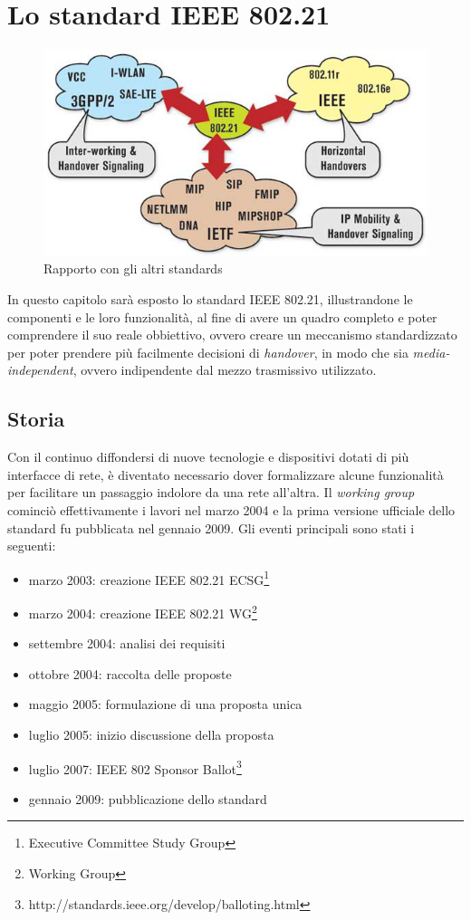 \chapter{Lo standard IEEE 802.21}

\begin{figure}[h!]
\centering
\includegraphics[scale=0.6]{ieee80221_cloud.jpg}
\caption{Rapporto con gli altri standards}
\end{figure}

In questo capitolo sarà esposto lo standard IEEE 802.21, illustrandone le componenti e le loro funzionalità, al fine di avere un quadro completo e poter comprendere il suo reale obbiettivo, ovvero creare un meccanismo standardizzato per poter prendere più facilmente decisioni di {\em handover}, in modo che sia {\em media-independent}, ovvero indipendente dal mezzo trasmissivo utilizzato.

\section{Storia}
Con il continuo diffondersi di nuove tecnologie e dispositivi dotati di più interfacce di rete, è diventato necessario dover formalizzare alcune funzionalità per facilitare un passaggio indolore da una rete all'altra.
Il {\em working group} cominciò effettivamente i lavori nel marzo 2004 e la prima versione ufficiale dello standard fu pubblicata nel gennaio 2009. Gli eventi principali sono stati i seguenti:
\begin{itemize}
\item marzo 2003: creazione IEEE 802.21 ECSG\footnote{Executive Committee Study Group}
\item marzo 2004: creazione IEEE 802.21 WG\footnote{Working Group}
\item settembre 2004: analisi dei requisiti
\item ottobre 2004: raccolta delle proposte
\item maggio 2005: formulazione di una proposta unica
\item luglio 2005: inizio discussione della proposta
\item luglio 2007: IEEE 802 Sponsor Ballot\footnote{http://standards.ieee.org/develop/balloting.html}
\item gennaio 2009: pubblicazione dello standard
\end{itemize}

